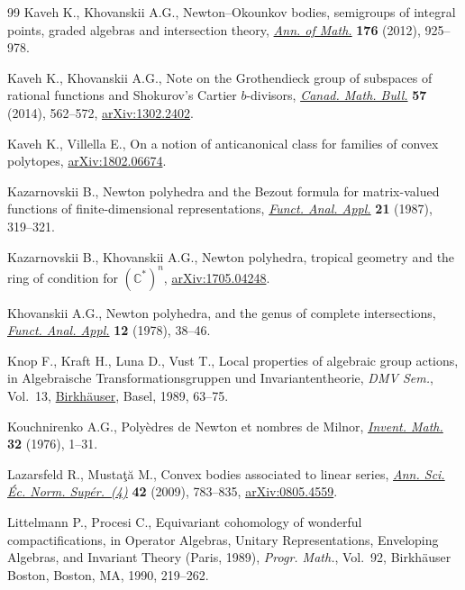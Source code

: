 \begin{thebibliography}{99}
Kaveh K., Khovanskii A.G., Newton--{O}kounkov bodies, semigroups of integral
 points, graded algebras and intersection theory, \href{https://doi.org/10.4007/annals.2012.176.2.5}{\textit{Ann. of Math.}}
 \textbf{176} (2012), 925--978.

Kaveh K., Khovanskii A.G., Note on the {G}rothendieck group of subspaces of
 rational functions and {S}hokurov's {C}artier {$b$}-divisors, \href{https://doi.org/10.4153/CMB-2013-039-6}{\textit{Canad.
 Math. Bull.}} \textbf{57} (2014), 562--572, \href{https://arxiv.org/abs/1302.2402}{arXiv:1302.2402}.

Kaveh K., Villella E., On a notion of anticanonical class for families of
 convex polytopes, \href{https://arxiv.org/abs/1802.06674}{arXiv:1802.06674}.

Kazarnovskii B., Newton polyhedra and the {B}ezout formula for matrix-valued
 functions of finite-dimensional representations, \href{https://doi.org/10.1007/BF01077809}{\textit{Funct. Anal. Appl.}} \textbf{21} (1987), 319--321.

Kazarnovskii B., Khovanskii A.G., Newton polyhedra, tropical geometry and the
 ring of condition for $({\mathbb C}^*)^n$, \href{https://arxiv.org/abs/1705.04248}{arXiv:1705.04248}.

Khovanskii A.G., Newton polyhedra, and the genus of complete intersections,
 \href{https://doi.org/10.1007/BF01077562}{\textit{Funct. Anal. Appl.}} \textbf{12} (1978), 38--46.

Knop F., Kraft H., Luna D., Vust T., Local properties of algebraic group
 actions, in Algebraische {T}ransformationsgruppen und {I}nvariantentheorie,
 \textit{DMV Sem.}, Vol.~13, \href{https://doi.org/10.1007/978-3-0348-7662-9_4}{Birkh\"{a}user}, Basel, 1989, 63--75.

Kouchnirenko A.G., Poly\`edres de {N}ewton et nombres de {M}ilnor,
 \href{https://doi.org/10.1007/BF01389769}{\textit{Invent. Math.}} \textbf{32} (1976), 1--31.

Lazarsfeld R., Musta\c{t}\u{a} M., Convex bodies associated to linear series,
 \href{https://doi.org/10.24033/asens.2109}{\textit{Ann. Sci. \'Ec. Norm. Sup\'er.~(4)}} \textbf{42} (2009), 783--835, \href{https://arxiv.org/abs/0805.4559}{arXiv:0805.4559}.

Littelmann P., Procesi C., Equivariant cohomology of wonderful
 compactifications, in Operator Algebras, Unitary Representations, Enveloping
 Algebras, and Invariant Theory ({P}aris, 1989), \textit{Progr. Math.},
 Vol.~92, Birkh\"{a}user Boston, Boston, MA, 1990, 219--262.


\end{thebibliography}
